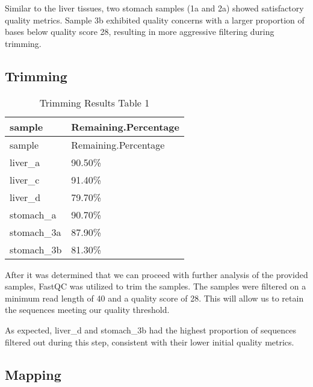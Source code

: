 \documentclass[
]{article}
\begin{document}
Similar to the liver tissues, two stomach samples (1a and 2a) showed
satisfactory quality metrics. Sample 3b exhibited quality concerns with
a larger proportion of bases below quality score 28, resulting in more
aggressive filtering during trimming.

\subsection{Trimming}\label{trimming}

\begin{longtable}[]{@{}ll@{}}
\caption{Trimming Results \textbar{} Table 1}\tabularnewline
\toprule\noalign{}
sample & Remaining.Percentage \\
\midrule\noalign{}
\endfirsthead
\toprule\noalign{}
sample & Remaining.Percentage \\
\midrule\noalign{}
\endhead
\bottomrule\noalign{}
\endlastfoot
liver\_a & 90.50\% \\
liver\_c & 91.40\% \\
liver\_d & 79.70\% \\
stomach\_a & 90.70\% \\
stomach\_3a & 87.90\% \\
stomach\_3b & 81.30\% \\
\end{longtable}

After it was determined that we can proceed with further analysis of the
provided samples, FastQC was utilized to trim the samples. The samples
were filtered on a minimum read length of 40 and a quality score of 28.
This will allow us to retain the sequences meeting our quality
threshold.

As expected, liver\_d and stomach\_3b had the highest proportion of
sequences filtered out during this step, consistent with their lower
initial quality metrics.

\subsection{Mapping}\label{mapping}
\end{document}
